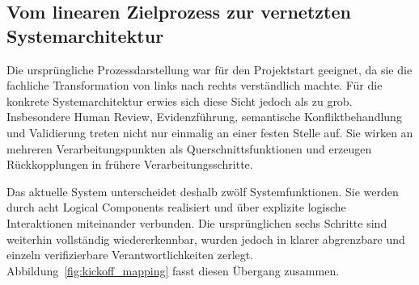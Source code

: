 \subsection{Vom linearen Zielprozess zur vernetzten Systemarchitektur}

Die ursprüngliche Prozessdarstellung war für den Projektstart geeignet, da sie die fachliche Transformation von links nach rechts verständlich machte. Für die konkrete Systemarchitektur erwies sich diese Sicht jedoch als zu grob. Insbesondere Human Review, Evidenzführung, semantische Konfliktbehandlung und Validierung treten nicht nur einmalig an einer festen Stelle auf. Sie wirken an mehreren Verarbeitungspunkten als Querschnittsfunktionen und erzeugen Rückkopplungen in frühere Verarbeitungsschritte.

Das aktuelle System unterscheidet deshalb zwölf Systemfunktionen. Sie werden durch acht Logical Components realisiert und über explizite logische Interaktionen miteinander verbunden. Die ursprünglichen sechs Schritte sind weiterhin vollständig wiedererkennbar, wurden jedoch in klarer abgrenzbare und einzeln verifizierbare Verantwortlichkeiten zerlegt. Abbildung~\ref{fig:kickoff_mapping} fasst diesen Übergang zusammen.

